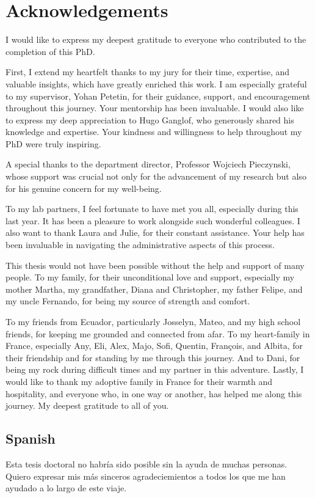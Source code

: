 \chapter*{Acknowledgements}

I would like to express my deepest gratitude to everyone who contributed to the
completion of this PhD. 


First, I extend my heartfelt thanks to my jury for their
time, expertise, and valuable insights, which have greatly enriched this work. I
am especially grateful to my supervisor, Yohan Petetin, for their guidance,
support, and encouragement throughout this journey. Your mentorship has been
invaluable. I would also like to
express my deep appreciation to Hugo Ganglof, who generously shared his
knowledge and expertise. Your kindness and willingness to help throughout my PhD
were truly inspiring. 

A special thanks to the department director, Professor Wojciech
Pieczynski, whose support was crucial not only for the advancement of my
research but also for his genuine concern for my well-being.

To my lab partners, I feel fortunate to have met you all,
especially during this last year. It has been a pleasure to work alongside such
wonderful colleagues. I also want to thank Laura and Julie, for their constant 
assistance. Your help has been invaluable
in navigating the administrative aspects of this process.

This thesis would not have been possible without the help and support of many
people. To my family, for their unconditional love and support, especially my
mother Martha, my grandfather, Diana and Christopher, my father Felipe, and my uncle
Fernando, for being my source of strength and comfort.

To my friends from
Ecuador, particularly Josselyn, Mateo, and my high school friends, for keeping
me grounded and connected from afar. 
To my heart-family in France, especially
Any, Eli, Alex, Majo, Sofi, Quentin, François, and Albita, 
for their friendship and for
standing by me through this journey. And to Dani, for being my rock during
difficult times and my partner in this adventure. 
Lastly, I would like to thank my adoptive family in France for their warmth 
and hospitality, and everyone who,
in one way or another, has helped me along this journey. My deepest gratitude to
all of you.

\section*{Spanish}
Esta tesis doctoral no habría sido posible sin la ayuda de muchas personas.
Quiero expresar mis más sinceros agradeciemientos
a todos los que me han ayudado a lo largo de este viaje. 


